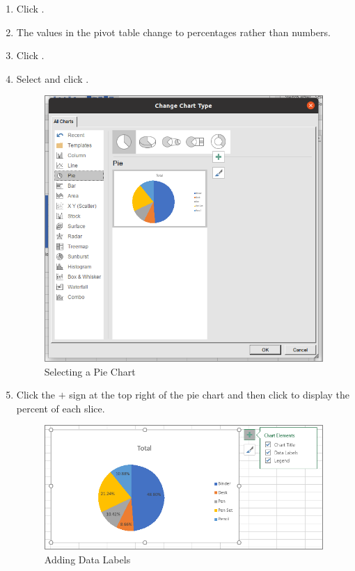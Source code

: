 \begin{enumbox}
\begin{enumerate}
		\item Click .
		\item The values in the pivot table change to percentages rather than numbers.
	
		\item Click .
		\item Select  and click .
	
		\begin{figure}[H]
			\centering
			\includegraphics[width=\maxwidth{.95\linewidth}]{gfx/ch07_fig30}
			\caption{Selecting a Pie Chart}
			\label{07:fig30}
		\end{figure}

		\item Click the $ + $ sign at the top right of the pie chart and then click  to display the percent of each slice.

		\begin{figure}[H]
			\centering
			\includegraphics[width=\maxwidth{.95\linewidth}]{gfx/ch07_fig31}
			\caption{Adding Data Labels}
			\label{07:fig31}
		\end{figure}


\end{enumerate}
\end{enumbox}

